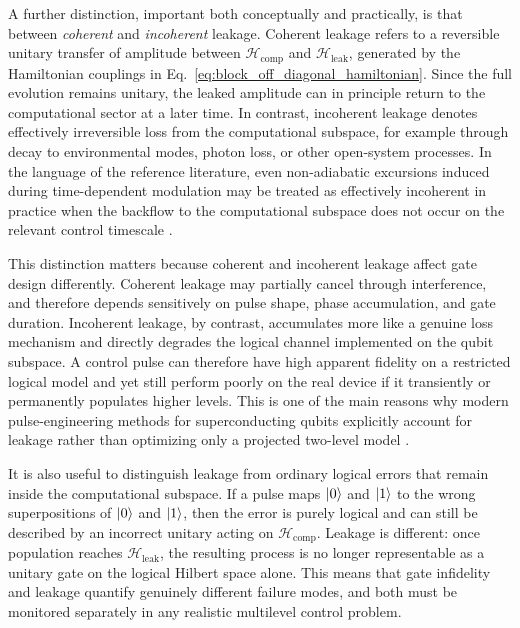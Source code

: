 A further distinction, important both conceptually and practically, is that between \emph{coherent} and \emph{incoherent} leakage. Coherent leakage refers to a reversible unitary transfer of amplitude between $\mathcal{H}_{\mathrm{comp}}$ and $\mathcal{H}_{\mathrm{leak}}$, generated by the Hamiltonian couplings in Eq.~\eqref{eq:block_off_diagonal_hamiltonian}. Since the full evolution remains unitary, the leaked amplitude can in principle return to the computational sector at a later time. In contrast, incoherent leakage denotes effectively irreversible loss from the computational subspace, for example through decay to environmental modes, photon loss, or other open-system processes. In the language of the reference literature, even non-adiabatic excursions induced during time-dependent modulation may be treated as effectively incoherent in practice when the backflow to the computational subspace does not occur on the relevant control timescale \cite{Niu2019}.

This distinction matters because coherent and incoherent leakage affect gate design differently. Coherent leakage may partially cancel through interference, and therefore depends sensitively on pulse shape, phase accumulation, and gate duration. Incoherent leakage, by contrast, accumulates more like a genuine loss mechanism and directly degrades the logical channel implemented on the qubit subspace. A control pulse can therefore have high apparent fidelity on a restricted logical model and yet still perform poorly on the real device if it transiently or permanently populates higher levels. This is one of the main reasons why modern pulse-engineering methods for superconducting qubits explicitly account for leakage rather than optimizing only a projected two-level model \cite{Motzoi2009,Gambetta2011,Koch2022}.

It is also useful to distinguish leakage from ordinary logical errors that remain inside the computational subspace. If a pulse maps $\ket{0}$ and $\ket{1}$ to the wrong superpositions of $\ket{0}$ and $\ket{1}$, then the error is purely logical and can still be described by an incorrect unitary acting on $\mathcal{H}_{\mathrm{comp}}$. Leakage is different: once population reaches $\mathcal{H}_{\mathrm{leak}}$, the resulting process is no longer representable as a unitary gate on the logical Hilbert space alone. This means that gate infidelity and leakage quantify genuinely different failure modes, and both must be monitored separately in any realistic multilevel control problem.


